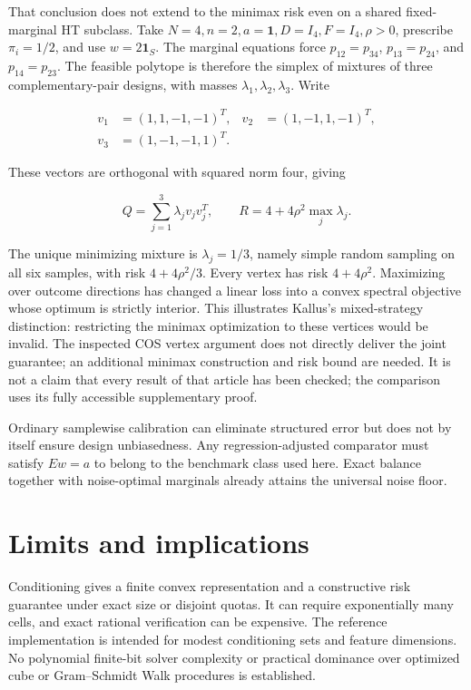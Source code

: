 \documentclass[11pt]{article}
\begin{document}
That conclusion does not extend to the minimax risk even on a shared
fixed-marginal HT subclass. Take
\(N=4,n=2,a=\mathbf1,D=I_4,F=I_4,\rho>0\), prescribe \(\pi_i=1/2\), and
use \(w=2\mathbf1_S\). The marginal equations force \(p_{12}=p_{34}\),
\(p_{13}=p_{24}\), and \(p_{14}=p_{23}\). The feasible polytope is
therefore the simplex of mixtures of three complementary-pair designs,
with masses \(\lambda_1,\lambda_2,\lambda_3\). Write

\[
\begin{aligned}
v_1&=(1,1,-1,-1)^T,&v_2&=(1,-1,1,-1)^T,\\
v_3&=(1,-1,-1,1)^T.
\end{aligned}
\]

These vectors are orthogonal with squared norm four, giving

\[
Q=\sum_{j=1}^3\lambda_jv_jv_j^T,\qquad
R=4+4\rho^2\max_j\lambda_j.
\]

The unique minimizing mixture is \(\lambda_j=1/3\), namely simple random
sampling on all six samples, with risk \(4+4\rho^2/3\). Every vertex has
risk \(4+4\rho^2\). Maximizing over outcome directions has changed a
linear loss into a convex spectral objective whose optimum is strictly
interior. This illustrates Kallus's mixed-strategy distinction:
restricting the minimax optimization to these vertices would be invalid.
The inspected COS vertex argument does not directly deliver the joint
guarantee; an additional minimax construction and risk bound are needed.
It is not a claim that every result of that article has been checked;
the comparison uses its fully accessible supplementary proof.

Ordinary samplewise calibration can eliminate structured error but does not by itself ensure design unbiasedness. Any regression-adjusted comparator must satisfy $Ew=a$ to belong to the benchmark class used here. Exact balance together with noise-optimal marginals already attains the universal noise floor.

\section{Limits and implications}\label{limits-and-implications}

Conditioning gives a finite convex representation and a constructive
risk guarantee under exact size or disjoint quotas. It can require
exponentially many cells, and exact rational verification can be
expensive. The reference implementation is intended for modest
conditioning sets and feature dimensions. No polynomial finite-bit
solver complexity or practical dominance over optimized cube or
Gram--Schmidt Walk procedures is established.
\end{document}
